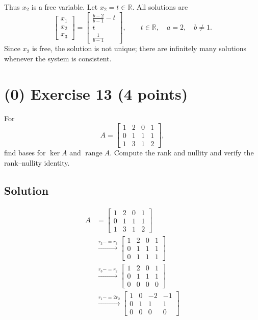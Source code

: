 \documentclass[12pt,a4paper]{article}
\begin{document}
Thus $x_2$ is a free variable. Let $x_2=t\in\mathbb{R}$. All solutions are
\[
\begin{bmatrix}x_1\\x_2\\x_3\end{bmatrix}
=
\begin{bmatrix}\frac{b-2}{b-1}-t\\t\\\frac{1}{b-1}\end{bmatrix},
\qquad t\in\mathbb{R},\quad a=2,\quad b\ne1.
\]
Since $x_2$ is free, the solution is not unique; there are infinitely many
solutions whenever the system is consistent.

\vspace{3cm}
\clearpage
\section*{(0) Exercise 13 \hfill {\normalsize (4 points)}}
For
\[
A=\begin{bmatrix}1&2&0&1\\0&1&1&1\\1&3&1&2\end{bmatrix},
\]
find bases for $\ker A$ and $\operatorname{range}A$. Compute the rank and nullity and verify the rank--nullity identity.
\subsection*{Solution}

\begin{align*}
	A &= \begin{bmatrix}
		1 & 2 & 0 & 1 \\
		0 & 1 & 1 & 1 \\
		1 & 3 & 1 & 2
	\end{bmatrix} \\
	&\overset{r_3 -= r_3}{\rightarrow} \begin{bmatrix}
		1 & 2 & 0 & 1 \\
		0 & 1 & 1 & 1 \\
		0 & 1 & 1 & 1 
	\end{bmatrix} \\
	&\overset{r_3 -= r_2}{\rightarrow} \begin{bmatrix}
		1 & 2 & 0 & 1 \\
		0 & 1 & 1 & 1 \\
		0 & 0 & 0 & 0
	\end{bmatrix} \\
	&\overset{r_1 -= 2r_2}{\rightarrow} \begin{bmatrix}
		1 & 0 & -2 & -1 \\
		0 & 1 & 1 & 1 \\
		0 & 0 & 0 & 0
	\end{bmatrix}
\end{align*}
\end{document}

